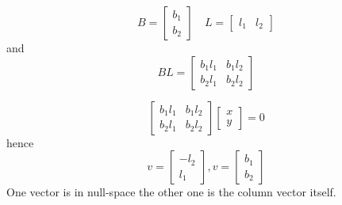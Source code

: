\begin{equation}
    B=\begin{bmatrix}b_1\\b_2\end{bmatrix}\quad 
    L=\begin{bmatrix}l_1& l_2\end{bmatrix}
\end{equation}
and 
\begin{equation}
    BL=\begin{bmatrix}b_1l_1&b_1l_2\\b_2l_1&b_2l_2\end{bmatrix}
\end{equation}

\begin{equation}
    \begin{bmatrix}b_1l_1&b_1l_2\\b_2l_1&b_2l_2\end{bmatrix}\begin{bmatrix}x\\y\end{bmatrix}=0
\end{equation}
hence
\begin{equation}
    v=\begin{bmatrix}-l_2\\l_1\end{bmatrix},v=\begin{bmatrix}b_1\\b_2\end{bmatrix}
\end{equation}
One vector is in null-space the other one is the column vector itself.
